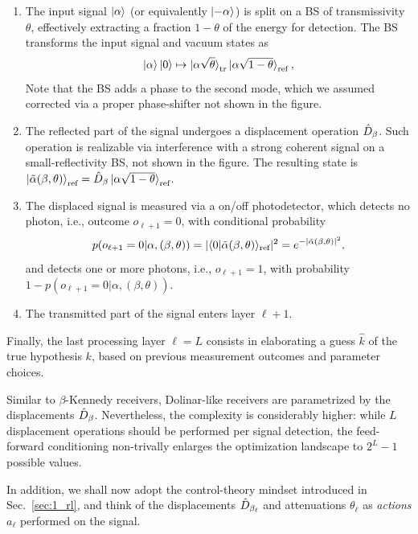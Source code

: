 \begin{enumerate}
\item The input signal $\ket{\alpha}$ (or equivalently $\ket{-\alpha}$) is split on a BS of transmissivity $\theta$, effectively extracting a fraction $1-\theta$ of the energy for detection. The BS transforms the input signal and vacuum states as
\begin{equation}
\ket{\alpha}\ket{0}\mapsto\ket{\alpha\sqrt{\theta}}_{\rm tr}\ket{\alpha\sqrt{1-\theta}}_{\rm ref},
\end{equation}
Note that the BS adds a phase to the second mode, which we assumed corrected via a proper phase-shifter not shown in the figure.
\item The reflected part of the signal undergoes a displacement operation $\hat{D}_{\beta}$. Such operation is realizable via interference with a strong coherent signal on a small-reflectivity BS, not shown in the figure. The resulting state is $\ket{\tilde{\alpha}(\beta,\theta)}_{\text{ref}}=\Dis{\beta}\ket{\alpha\sqrt{1-\theta}}_{\text{ref}}$.
\item\label{ops:end} The displaced signal is measured via a on/off photodetector, which detects no photon, i.e., outcome $o_{\ell+1} = 0$, with conditional probability
\begin{equation}\label{eq:313singLayProb}
p(o_{\ell+1}=0|\alpha,(\beta,\theta))=\lvert\langle 0 | \tilde{\alpha}(\beta,\theta) \rangle_{\text{ref}}\rvert^{2}=e^{-\lvert\tilde{\alpha}(\beta,\theta)\rvert^{2}},
\end{equation}
and detects one or more photons, i.e., $o_{\ell+1}=1$, with probability $1-p(o_{\ell+1}=0|\alpha,(\beta,\theta))$.
\item The transmitted part of the signal enters layer $\ell+1$.
\end{enumerate}
Finally, the last processing layer $\ell=L$ consists in elaborating a guess $\hat{k}$ of the true hypothesis $k$, based on previous measurement outcomes and parameter choices.

Similar to $\beta$-Kennedy receivers, Dolinar-like receivers are parametrized by the displacements $\hat{D}_{\beta}$. Nevertheless, the complexity is considerably higher: while $L$ displacement operations should be performed per signal detection, the feed-forward conditioning non-trivally enlarges the optimization landscape to $2^{L}-1$ possible values.

In addition, we shall now adopt the control-theory mindset introduced in Sec.~\ref{sec:1_rl},%
and think of the displacements $\hat{D}_{\beta_\ell}$ and attenuations $\theta_\ell$ as \textit{actions} $a_{\ell}$ performed on the signal.

